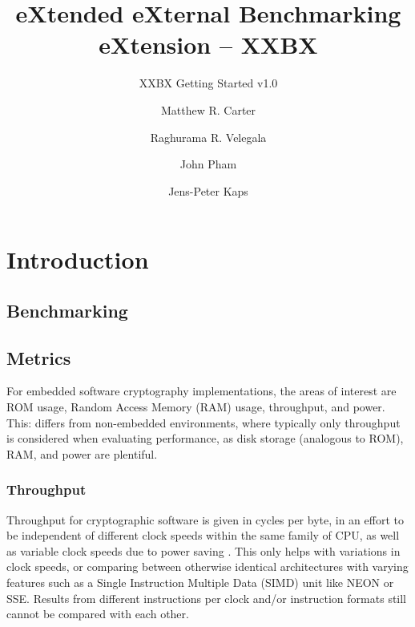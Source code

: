\documentclass[twoside,11pt]{cergdoc}
\begin{document}

\title{eXtended eXternal Benchmarking eXtension -- XXBX}
\subtitle{XXBX Getting Started v1.0}
\author{Matthew R. Carter \and Raghurama R. Velegala \and John Pham \and Jens-Peter Kaps}

\maketitle

\tableofcontents

\chapter{Introduction}
  \section{Benchmarking}
  \section{Metrics}
For embedded software cryptography implementations, the areas of interest are
ROM usage, Random Access Memory (RAM) usage, throughput, and power. This:
differs from non-embedded environments, where typically only throughput is
considered when evaluating performance, as disk storage (analogous to ROM), RAM,
and power are plentiful.  

    \subsection{Throughput}
Throughput for cryptographic software is given in cycles per byte, in an effort
to be independent of different clock speeds within the same family of CPU, as
well as variable clock speeds due to power saving \cite{sha3bench}. This only
helps with variations in clock speeds, or comparing between otherwise identical
architectures with varying features such as a Single Instruction Multiple Data
(SIMD) unit like NEON or SSE. Results from different
instructions per clock and/or instruction formats still cannot be compared with
each other.
\end{document}

